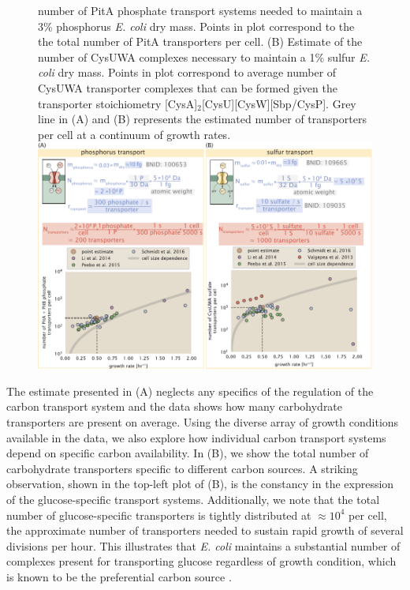 \begin{figure}
\begin{fullwidth}
{    number of PitA phosphate transport systems needed to maintain a 3\%
    phosphorus \textit{E. coli} dry mass. Points in plot correspond to
    the the total number of PitA transporters per cell. (B) Estimate of
    the number of CysUWA complexes necessary to maintain a 1\% sulfur
    \textit{E. coli} dry mass. Points in plot correspond to average
    number of CysUWA transporter complexes that can be formed given the
    transporter stoichiometry [CysA]$_2$[CysU][CysW][Sbp/CysP]. Grey line
    in (A) and (B) represents the estimated number of transporters per
    cell at a continuum of growth rates.}{\includegraphics{main_figs/fig3_phospho_sulfo_transport.pdf}}\label{figsupp:phospho_sulfo}
    \end{fullwidth}
\end{figure}

The estimate presented in (A) neglects any specifics of the
regulation of the carbon transport system and the data shows how many
carbohydrate transporters are present on average. Using the diverse array of
growth conditions available in the data, we also explore how individual carbon
transport systems depend on specific carbon availability. In
(B), we show the total number of carbohydrate transporters
specific to different carbon sources. A striking observation, shown in the
top-left plot of (B), is the constancy in the expression of
the glucose-specific transport systems. Additionally, we note that the total
number of glucose-specific transporters is tightly distributed at $\approx 10^4$
per cell, the approximate number of transporters needed to sustain rapid growth
of several divisions per hour. This illustrates that \textit{E. coli} maintains
a substantial number of complexes present for transporting glucose regardless of
growth condition, which is known to be the preferential carbon source
\citep{monod1947, liu2005a, aidelberg2014}.

